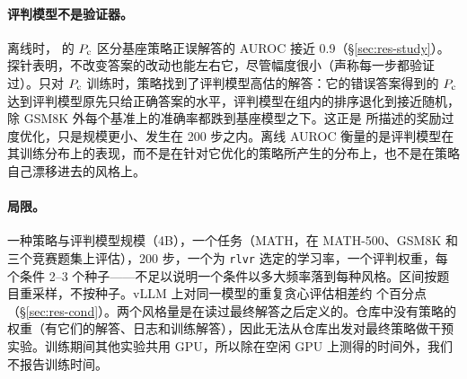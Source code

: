 \paragraph{评判模型不是验证器。} 离线时，\kev{} 的 $P_{\mathrm{c}}$ 区分基座策略正误解答的 AUROC 接近 0.9（\S\ref{sec:res-study}）。探针表明，不改变答案的改动也能左右它，尽管幅度很小（声称每一步都验证过）。只对 $P_{\mathrm{c}}$ 训练时，策略找到了评判模型高估的解答：它的错误答案得到的 $P_{\mathrm{c}}$ 达到评判模型原先只给正确答案的水平，评判模型在组内的排序退化到接近随机，除 GSM8K 外每个基准上的准确率都跌到基座模型之下。这正是 \citet{gao2023scaling} 所描述的奖励过度优化，只是规模更小、发生在 200 步之内。离线 AUROC 衡量的是评判模型在其训练分布上的表现，而不是在针对它优化的策略所产生的分布上，也不是在策略自己漂移进去的风格上。

\paragraph{局限。} 一种策略与评判模型规模（4B），一个任务（MATH，在 MATH-500、GSM8K 和三个竞赛题集上评估），200 步，一个为 \texttt{rlvr} 选定的学习率，一个评判权重，每个条件 2--3 个种子——不足以说明一个条件以多大频率落到每种风格。区间按题目重采样，不按种子。vLLM 上对同一模型的重复贪心评估相差约  个百分点（\S\ref{sec:res-cond}）。两个风格量是在读过最终解答之后定义的。仓库中没有策略的权重（有它们的解答、日志和训练解答），因此无法从仓库出发对最终策略做干预实验。训练期间其他实验共用 GPU，所以除在空闲 GPU 上测得的时间外，我们不报告训练时间。
